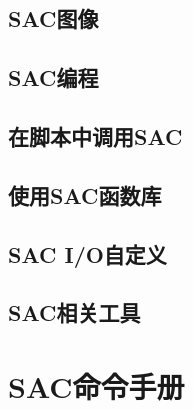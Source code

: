 \documentclass[a4paper, 11pt, twoside]{book}
\begin{document}
\chapter{SAC图像}
\label{chap:sac-graphics}







\chapter{SAC编程}
\label{chap:sac-programming}






\chapter{在脚本中调用SAC}
\label{chap:sac-script}



\chapter{使用SAC函数库}
\label{chap:sac-libs}




\chapter{SAC I/O自定义}
\label{chap:sac-custom-io}


\chapter{SAC相关工具}






\part{SAC命令手册}
\end{document}
